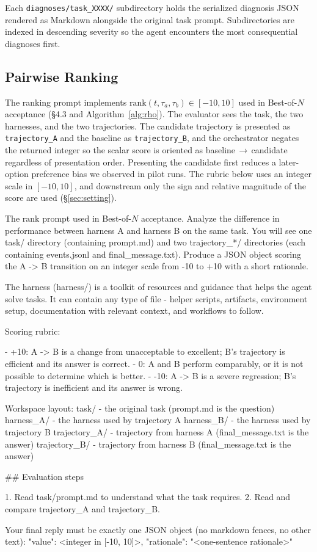\documentclass{llmxive}
\begin{document}
\noindent Each \texttt{diagnoses/task\_XXXX/} subdirectory holds the
serialized diagnosis JSON rendered as Markdown alongside the original
task prompt. Subdirectories are indexed in descending severity so the
agent encounters the most consequential diagnoses first.

\subsection{Pairwise Ranking}

 The ranking prompt implements
$\mathrm{rank}(t, \tau_a, \tau_b) \in [-10, 10]$ used in Best-of-$N$
acceptance (\S 4.3 and Algorithm~\ref{alg:rho}). The evaluator sees the task, the
two harnesses, and the two trajectories. The candidate trajectory is
presented as \texttt{trajectory\_A} and the baseline as
\texttt{trajectory\_B}, and the orchestrator negates the returned integer
so the scalar score is oriented as baseline\,$\to$\,candidate
regardless of presentation order. Presenting the candidate first
reduces a later-option preference bias we observed in pilot runs.
The rubric below uses an integer scale in $[-10,10]$, and downstream only
the sign and relative magnitude of the score are used (\S\ref{sec:setting}).

\begin{promptbox}{The $\mathrm{rank}$ prompt used in Best-of-$N$ acceptance.}
Analyze the difference in performance between harness A and harness B on the same task. You will see one task/ directory (containing prompt.md) and two trajectory_*/ directories (each containing events.jsonl and final_message.txt). Produce a JSON object scoring the A -> B transition on an integer scale from -10 to +10 with a short rationale.

The harness (harness/) is a toolkit of resources and guidance that helps the agent solve tasks. It can contain any type of file - helper scripts, artifacts, environment setup, documentation with relevant context, and workflows to follow.

Scoring rubric:

- +10: A -> B is a change from unacceptable to excellent; B's trajectory is efficient and its answer is correct.
- 0: A and B perform comparably, or it is not possible to determine which is better.
- -10: A -> B is a severe regression; B's trajectory is inefficient and its answer is wrong.

Workspace layout:
  task/                 - the original task (prompt.md is the question)
  harness_A/            - the harness used by trajectory A
  harness_B/            - the harness used by trajectory B
  trajectory_A/         - trajectory from harness A (final_message.txt is the answer)
  trajectory_B/         - trajectory from harness B (final_message.txt is the answer)

## Evaluation steps

1. Read task/prompt.md to understand what the task requires.
2. Read and compare trajectory_A and trajectory_B.

Your final reply must be exactly one JSON object (no markdown fences, no other text):
{"value": <integer in [-10, 10]>, "rationale": "<one-sentence rationale>"}
\end{promptbox}
\end{document}
